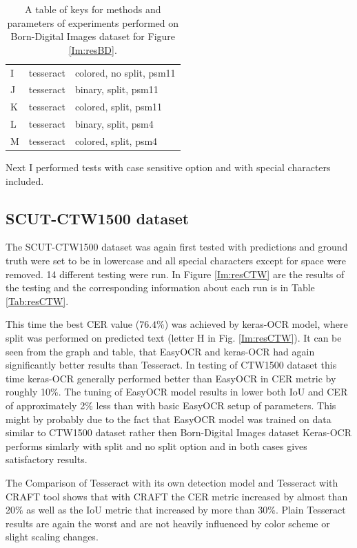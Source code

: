 {\begin{table}[!hbt]
\begin{tabular}{|l|l|l|}
        I & tesseract & colored, no split, psm11\\ 
        J & tesseract & binary, split, psm11\\ 
        K & tesseract & colored, split, psm11\\ 
        L & tesseract & binary, split, psm4\\ 
        M & tesseract & colored, split, psm4\\ \hline
    \end{tabular}
    \caption{A table of keys for methods and parameters of experiments performed on Born-Digital Images dataset for Figure \ref*{Im:resBD}.}
    \label{Tab:resBD}
\end{table}
}

Next I performed tests with case sensitive option and with special characters included.

\subsection*{SCUT-CTW1500 dataset}
The SCUT-CTW1500 dataset was again first tested with predictions and ground truth were set to be in lowercase and all special characters except for space were removed. 14 different testing were run.  In Figure \ref*{Im:resCTW} are the results of the testing and the corresponding information about each run is in Table \ref*{Tab:resCTW}. 

This time the best CER value ($76.4\%$) was achieved by keras-OCR model, where split was performed on predicted text (letter H in Fig. \ref*{Im:resCTW}). It can be seen from the graph and table, that EasyOCR and keras-OCR had again significantly better results than Tesseract. In testing of CTW1500 dataset this time keras-OCR generally performed better than EasyOCR in CER metric by roughly 10\%. The tuning of EasyOCR model results in lower both IoU and CER of approximately 2\% less than with basic EasyOCR setup of parameters. This might by probably due to the fact that EasyOCR model was trained on data similar to CTW1500 dataset rather then Born-Digital Images dataset Keras-OCR performs simlarly with split and no split option and in both cases gives satisfactory results.

The Comparison of Tesseract with its own detection model and Tesseract with CRAFT tool shows that with CRAFT the CER metric increased by almost than 20\% as well as the IoU metric that increased by more than 30\%. Plain Tesseract results are again the worst and are not heavily influenced by color scheme or slight scaling changes. 

